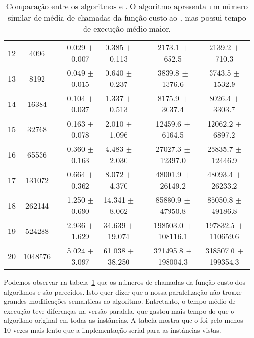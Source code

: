 \begin{table}
\begin{tabular}{cc c cc c cc}
12 &    4096 && 0.029 $\pm$ 0.007 & 0.385 $\pm$ 0.113 && 2173.1 $\pm$ 652.5 & 2139.2 $\pm$ 710.3 \\
13 &    8192 && 0.049 $\pm$ 0.015 & 0.640 $\pm$ 0.237 && 3839.8 $\pm$ 1376.6 & 3743.5 $\pm$ 1532.9 \\
14 &   16384 && 0.104 $\pm$ 0.037 & 1.337 $\pm$ 0.513 && 8175.9 $\pm$ 3037.4 & 8026.4 $\pm$ 3303.7 \\
15 &   32768 && 0.163 $\pm$ 0.078 & 2.010 $\pm$ 1.096 && 12459.6 $\pm$ 6164.5 & 12062.2 $\pm$ 6897.2 \\
16 &   65536 && 0.360 $\pm$ 0.163 & 4.483 $\pm$ 2.030 && 27027.3 $\pm$ 12397.0 & 26835.7 $\pm$ 12446.9 \\
17 &  131072 && 0.664 $\pm$ 0.362 & 8.072 $\pm$ 4.370 && 48001.9 $\pm$ 26149.2 & 48093.4 $\pm$ 26233.2 \\
18 &  262144 && 1.250 $\pm$ 0.690 & 14.341 $\pm$ 8.062 && 85880.9 $\pm$ 47950.8 & 86050.8 $\pm$ 49186.8 \\
19 &  524288 && 2.936 $\pm$ 1.629 & 34.639 $\pm$ 19.074 && 198503.0 $\pm$ 108116.1 & 197832.5 $\pm$ 110659.6 \\
20 & 1048576 && 5.024 $\pm$ 3.097 & 61.038 $\pm$ 38.250 && 321495.8 $\pm$ 198004.3 & 318507.0 $\pm$ 199354.3 \\
\bottomrule
\end{tabular}
\caption{Comparação entre os algoritmos  e .
O algoritmo  apresenta um número similar de média de 
chamadas da função custo ao , mas possui tempo de execução 
médio maior.}
\label{tab:ppfs_vs_pfs}
\end{table}

Podemos observar na tabela~\ref{tab:ppfs_vs_pfs} que os números de 
chamadas da função custo dos algoritmos  e 
são parecidos. Isto quer dizer que a nossa paralelização não trouxe 
grandes modificações semanticas ao algoritmo. Entretanto, o tempo médio
de execução teve diferenças na versão paralela, que gastou mais tempo
do que o algoritmo original em todas as instâncias. A tabela mostra
que o  foi pelo menos 10 vezes mais lento que a 
implementação serial para as instâncias vistas.


